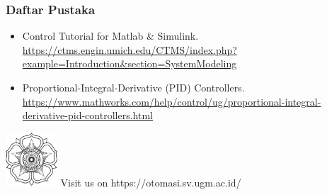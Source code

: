 \documentclass[10pt,xcolor={dvipsnames}]{beamer}
\begin{document}
		\begin{frame}
			\frametitle{Daftar Pustaka}
			\begin{itemize}
				\item Control Tutorial for Matlab \& Simulink. \url{https://ctms.engin.umich.edu/CTMS/index.php?example=Introduction&section=SystemModeling}
				\item Proportional-Integral-Derivative (PID) Controllers. \url{https://www.mathworks.com/help/control/ug/proportional-integral-derivative-pid-controllers.html}
			\end{itemize}
		\end{frame}
		
		
		\begin{frame}
			\begin{Center}
				\vspace{0.8cm}
				\includegraphics[height=2cm]{Lambang dan logo UGM/Lambang UGM-hitam.png}
				\vspace{0.2cm}
				\newline Visit us on https://otomasi.sv.ugm.ac.id/
				\newline {} 
				\hspace{1cm}
			\end{Center}
		\end{frame}
		
\end{document}
